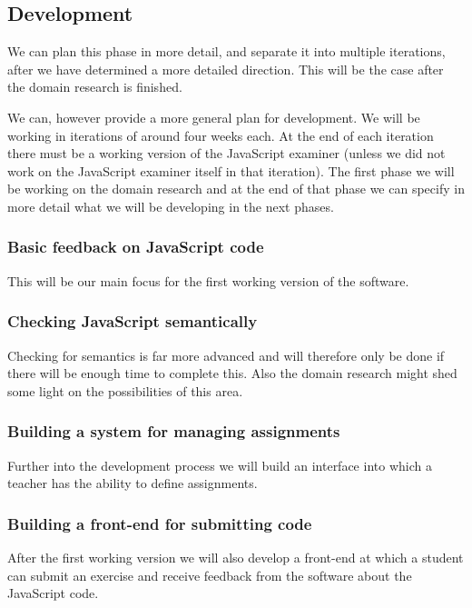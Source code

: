 \documentclass{article}
\begin{document}
\subsection{Development} 

We can plan this phase in more detail, and separate it into multiple
iterations, after we have determined a more detailed direction. This will be
the case after the domain research is finished.

We can, however provide a more general plan for development. We will be working
in iterations of around four weeks each. At the end of each iteration there
must be a working version of the JavaScript examiner (unless we did not work on
the JavaScript examiner itself in that iteration). The first phase we will be
working on the domain research and at the end of that phase we can specify in
more detail what we will be developing in the next phases.

\subsubsection{Basic feedback on JavaScript code}
This will be our main focus for the first working version of the software.

\subsubsection{Checking JavaScript semantically}
Checking for semantics is far more advanced and will therefore only be done if
there will be enough time to complete this. Also the domain research might shed
some light on the possibilities of this area.

\subsubsection{Building a system for managing assignments} 
Further into the development process we will build an interface into which a
teacher has the ability to define assignments.

\subsubsection{Building a front-end for submitting code}
After the first working version we will also develop a front-end at which a
student can submit an exercise and receive feedback from the software about the
JavaScript code.
\end{document}
